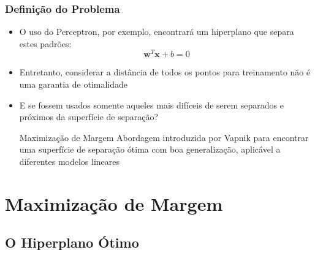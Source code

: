 \documentclass{beamer}
\begin{document}
\begin{frame}
	\frametitle{Definição do Problema}
	\begin{itemize}
		\item O uso do Perceptron, por exemplo, encontrará um hiperplano que separa estes padrões:
		\begin{equation}
	 		\textbf{w}^T\textbf{x} + b = 0
	 		\label{eq:plano}
 		\end{equation}
 		\item Entretanto, considerar a distância de todos os pontos para treinamento não é uma garantia de otimalidade
		\item E se fossem usados somente aqueles mais difíceis de serem separados e próximos da superfície de separação?
		
		\begin{block}{Maximização de Margem}
			Abordagem introduzida por Vapnik \cite{vapnik} para encontrar uma superfície de separação ótima com boa generalização, aplicável a diferentes modelos lineares
		\end{block}		

	\end{itemize}

\end{frame}

\section{Maximização de Margem}

\subsection{O Hiperplano Ótimo}
\end{document}
